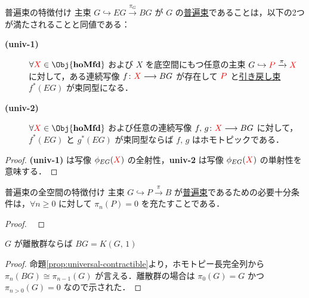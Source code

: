 \documentclass[TQFT_main]{subfiles}
\begin{document}
\begin{myprop}[label=prop:universal-basic]{普遍束の特徴付け}
    主束 $G \hookrightarrow EG \xrightarrow{\pi_G} BG$ が $G$ の\hyperref[def:universal-bundle]{普遍束}であることは，以下の2つが満たされることと同値である：
    \begin{description}
        \item[\textbf{(univ-1)}]  $\forall \textcolor{red}{X} \in \Obj{\bm{\mathrm{hoMfd}}}$ および $X$ を底空間にもつ任意の主束 $G \hookrightarrow \textcolor{red}{P} \xrightarrow{\pi} \textcolor{red}{X}$ に対して，ある連続写像 $f \colon \textcolor{red}{X} \longrightarrow BG$ が存在して
        $\textcolor{red}{P}$ と\hyperref[def:pullback-bundle]{引き戻し束} $f^*(EG)$ が束同型になる．
        \item[\textbf{(univ-2)}]  $\forall \textcolor{red}{X} \in \Obj{\bm{\mathrm{hoMfd}}}$ および任意の連続写像 $f,\, g \colon \textcolor{red}{X} \longrightarrow BG$ に対して，
        $f^*(EG)$ と $g^*(EG)$ が束同型ならば $f,\, g$ はホモトピックである．
    \end{description}
\end{myprop}

\begin{proof}
    \textsf{\textbf{(univ-1)}} は写像 $\phi_{EG}(\textcolor{red}{X})$ の全射性，\textsf{\textbf{univ-2}} は写像 $\phi_{EG}(\textcolor{red}{X})$ の単射性を意味する．
\end{proof}

\begin{myprop}[label=prop:universal-contractible]{普遍束の全空間の特徴付け}
    主束 $G \hookrightarrow P \xrightarrow{\pi} B$ が\hyperref[def:universal-bundle]{普遍束}であるための必要十分条件は，$\forall n \ge 0$ に対して $\pi_n(P) = 0$ を充たすことである．
\end{myprop}

\begin{proof}
    ~\cite[p.102, 19.4]{Steenrod1951}
\end{proof}

\begin{myprop}[label=prop:classifying-space-Kpi1]{}
    $G$ が離散群ならば $BG = K(G,\, 1)$
\end{myprop}

\begin{proof}
    命題\ref{prop:universal-contractible}より，ホモトピー長完全列から $\pi_n(BG) \cong \pi_{n-1}(G)$ が言える．離散群の場合は $\pi_0(G) = G$ かつ $\pi_{n>0}(G) = 0$ なので示された．
\end{proof}
\end{document}
